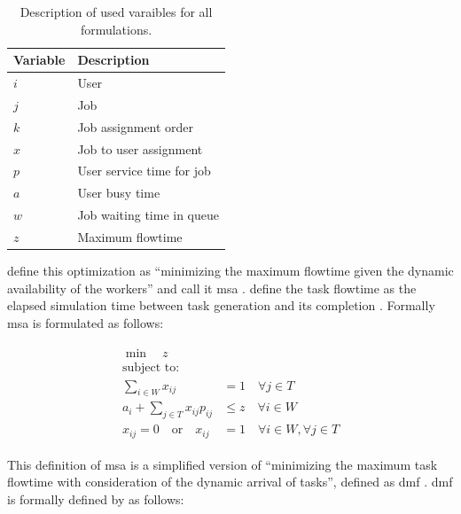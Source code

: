 \begin{table}[!ht]
\centering
\begin{tabular}{@{}ll@{}}
\toprule
Variable & Description \\ \midrule
$i$         & User            \\
$j$         & Job            \\
$k$         & Job assignment order            \\
$x$         & Job to user assignment            \\
$p$         & User service time for job            \\
$a$         & User busy time            \\
$w$         & Job waiting time in queue            \\
$z$         & Maximum flowtime            \\ \bottomrule
\end{tabular}
\caption{Description of used varaibles for all  formulations.}
\label{tab:milp_variables}
\end{table}

\citet{Zeng2005} define this optimization as ``minimizing the maximum flowtime given the dynamic availability of the workers'' and call it \gls{msa} \citep[p. 7]{Zeng2005}. \citet{Zeng2005} define the task flowtime as the elapsed simulation time between task generation and its completion \citep{Zeng2005,Baker1974}. Formally \gls{msa} is formulated as follows:

\begin{align}
	\begin{split}
	    \min \quad z\\
	    \text{subject to:} \\
	    \sum_{i \in W} x_{ij} &= 1 \quad \forall j \in T\\
	    a_i + \sum_{j \in T} x_{ij} p_{ij} &\leq z \quad \forall i \in W\\
	    x_{ij}=0 \quad \text{or} \quad x_{ij} &=1 \quad \forall i \in W, \forall j \in T
	\end{split}
\end{align}

This definition of \gls{msa} is a simplified version of ``minimizing the maximum task flowtime with consideration of the dynamic arrival of tasks'', defined as \gls{dmf} \citep{Baker1974,Zeng2005}. \gls{dmf} is formally defined by \citet{Zeng2005} as follows:

